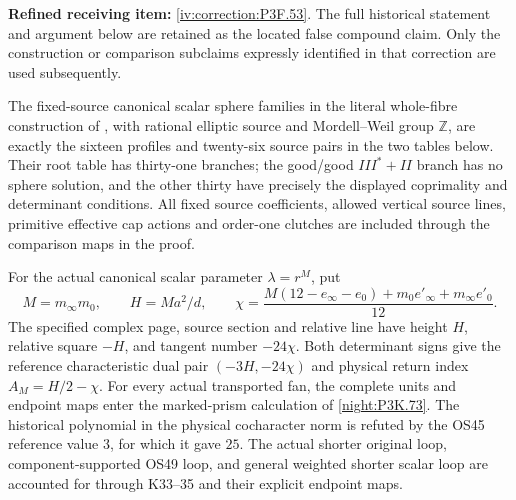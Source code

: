 \begin{theorem}\hypertarget{tag-02SW}{}\label{night:P3F.53}

\par\noindent\textbf{Refined receiving item:} \cref{iv:correction:P3F.53}. The full historical statement and argument below are retained as the located false compound claim. Only the construction or comparison subclaims expressly identified in that correction are used subsequently.

The fixed-source canonical scalar sphere families in the literal
whole-fibre construction of \cite[Remark~8.5, p.~24]{Engel2026}, with rational elliptic
source and Mordell--Weil group \(\mathbb Z\), are exactly the
sixteen profiles and twenty-six source pairs in the two tables below.
Their root table has thirty-one branches; the good/good
\(III^*+II\) branch has no sphere solution, and the other thirty
have precisely the displayed coprimality and determinant conditions.
All fixed source coefficients, allowed vertical source lines,
primitive effective cap actions and order-one clutches are included
through the comparison maps in the proof.

For the actual canonical scalar parameter \(\lambda=r^M\), put
\[
 M=m_\infty m_0,\qquad H=Ma^2/d,\qquad
 \chi=\frac{M(12-e_\infty-e_0)+m_0e'_\infty+m_\infty e'_0}{12}.
\]
The specified complex page, source section and relative line have
height \(H\), relative square \(-H\), and tangent number
\(-24\chi\). Both determinant signs give the reference characteristic
dual pair \((-3H,-24\chi)\) and physical return index \(A_M=H/2-\chi\).
For every actual transported fan, the complete units and endpoint
maps enter the marked-prism calculation of \cref{night:P3K.73}.
The historical polynomial in the physical cocharacter norm is
refuted by the OS45 reference value \(3\), for which it gave \(25\).
The actual shorter original loop, component-supported OS49 loop,
and general weighted shorter scalar loop are accounted for through
K33--35 and their explicit endpoint maps.

\end{theorem}

